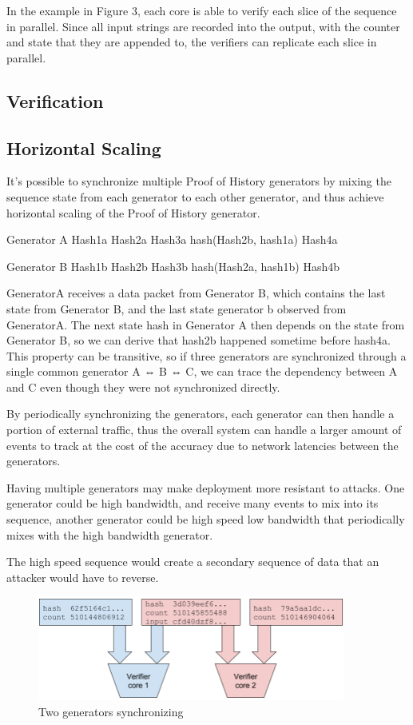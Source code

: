 \documentclass[12pt]{article}
\begin{document}
In the example in Figure 3, each core is able to verify each slice of the sequence in parallel.  Since all input strings are recorded into the output, with the counter and state that they are appended to, the verifiers can replicate each slice in parallel.
\subsection{Verification}

\subsection{Horizontal Scaling}
It’s possible to synchronize multiple Proof of History generators by mixing the sequence state from each generator to each other generator, and thus achieve horizontal scaling of the Proof of History generator.

Generator A
Hash1a
Hash2a
Hash3a hash(Hash2b, hash1a)
Hash4a

Generator B
Hash1b
Hash2b
Hash3b hash(Hash2a, hash1b)
Hash4b

GeneratorA receives a data packet from Generator B, which contains the last state from Generator B, and the last state generator b observed from GeneratorA.  The next state hash in Generator A then depends on the state from Generator B, so we can derive that hash2b happened sometime before hash4a.  This property can be transitive, so if three generators are synchronized through a single common generator A ⇔ B ⇔ C, we can trace the dependency between A and C even though they were not synchronized directly.

By periodically synchronizing the generators, each generator can then handle a portion of external traffic, thus the overall system can handle a larger amount of events to track at the cost of the accuracy due to network latencies between the generators.

Having multiple generators may make deployment more resistant to attacks.  One generator could be high bandwidth, and receive many events to mix into its sequence, another generator could be high speed low bandwidth that periodically mixes with the high bandwidth generator.

The high speed sequence would create a secondary sequence of data that an attacker would have to reverse.

\begin{figure}
  \begin{center}
    \centering
    \includegraphics[width=0.9\textwidth]{figures/fig_4.png}
    \caption[Fig 4]{Two generators synchronizing\label{fig_4}}
  \end{center}
  \end{figure}
\end{document}
